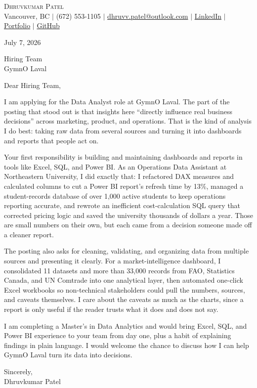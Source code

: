 \documentclass[letterpaper,11pt]{article}
\begin{document}
\begin{center}
    {\Large \scshape Dhruvkumar Patel}\\[2pt]
    \small Vancouver, BC $|$ (672) 553-1105 $|$ \href{mailto:dhruvv.patel@outlook.com}{dhruvv.patel@outlook.com} $|$
    \href{https://www.linkedin.com/in/dhruvkumarpatell/}{LinkedIn} $|$
    \href{https://dhruvvkumarpatel.vercel.app/}{Portfolio} $|$
    \href{https://github.com/pateldhruvkumar}{GitHub}
\end{center}

\vspace{8pt}
July 7, 2026

\vspace{4pt}
Hiring Team\\
GymnO Laval

\vspace{8pt}
Dear Hiring Team,

I am applying for the Data Analyst role at GymnO Laval. The part of the posting that stood out is that insights here ``directly influence real business decisions'' across marketing, product, and operations. That is the kind of analysis I do best: taking raw data from several sources and turning it into dashboards and reports that people act on.

Your first responsibility is building and maintaining dashboards and reports in tools like Excel, SQL, and Power BI. As an Operations Data Assistant at Northeastern University, I did exactly that: I refactored DAX measures and calculated columns to cut a Power BI report's refresh time by 13\%, managed a student-records database of over 1,000 active students to keep operations reporting accurate, and rewrote an inefficient cost-calculation SQL query that corrected pricing logic and saved the university thousands of dollars a year. Those are small numbers on their own, but each came from a decision someone made off a cleaner report.

The posting also asks for cleaning, validating, and organizing data from multiple sources and presenting it clearly. For a market-intelligence dashboard, I consolidated 11 datasets and more than 33,000 records from FAO, Statistics Canada, and UN Comtrade into one analytical layer, then automated one-click Excel workbooks so non-technical stakeholders could pull the numbers, sources, and caveats themselves. I care about the caveats as much as the charts, since a report is only useful if the reader trusts what it does and does not say.

I am completing a Master's in Data Analytics and would bring Excel, SQL, and Power BI experience to your team from day one, plus a habit of explaining findings in plain language. I would welcome the chance to discuss how I can help GymnO Laval turn its data into decisions.

\vspace{8pt}
Sincerely,\\
Dhruvkumar Patel
\end{document}
